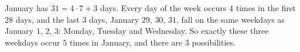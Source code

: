 January has $31=4\cdot7+3$ days. Every day of the week occurs $4$ times in the first $28$ days, and the last $3$ days, January $29$, $30$, $31$, fall on the same weekdays as January $1$, $2$, $3$: Monday, Tuesday and Wednesday. So exactly these three weekdays occur $5$ times in January, and there are $\boxed{3}$ possibilities.
